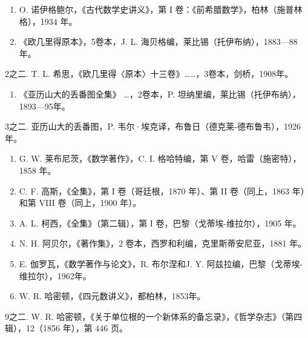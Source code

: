 
\begin{enumerate}
\def\labelenumi{\arabic{enumi}.}
\item
  O. 诺伊格鲍尔，《古代数学史讲义》，第 I 卷：《前希腊数学》，柏林（施普林格），1934 年。
\item
  《欧几里得原本》，5卷本，J. L. 海贝格编，莱比锡（托伊布纳），1883—88年。
\end{enumerate}

2之二. T. L. 希思，《欧几里得〈原本〉十三卷》……，3卷本，剑桥，1908年。

\begin{enumerate}
\def\labelenumi{\arabic{enumi}.}
\setcounter{enumi}{2}
\tightlist
\item
  《亚历山大的丢番图全集》 \ldots，2卷本，P. 坦纳里编，莱比锡（托伊布纳），1893—95年。
\end{enumerate}

3之二. 亚历山大的丢番图，P. 韦尔·埃克译，布鲁日（德克莱-德布鲁韦），1926年。

\begin{enumerate}
\def\labelenumi{\arabic{enumi}.}
\setcounter{enumi}{3}
\item
  G. W. 莱布尼茨，《数学著作》，C. I. 格哈特编，第 V 卷，哈雷（施密特），1858 年。
\item
  C. F. 高斯，《全集》，第 I 卷（哥廷根，1870 年）、第 II 卷（同上，1863 年）和第 VIII 卷（同上，1900 年）。
\item
  A. L. 柯西，《全集》（第二辑），第 I 卷，巴黎（戈蒂埃-维拉尔），1905 年。
\item
  N. H. 阿贝尔，《著作集》，2 卷本，西罗和利编，克里斯蒂安尼亚，1881 年。
\item
  E. 伽罗瓦，《数学著作与论文》，R. 布尔涅和J. Y. 阿兹拉编，巴黎（戈蒂埃-维拉尔），1962年。
\item
  W. R. 哈密顿，《四元数讲义》，都柏林，1853年。
\end{enumerate}

9之二. W. R. 哈密顿，《关于单位根的一个新体系的备忘录》，《哲学杂志》（第四辑），12（1856 年），第 446 页。

